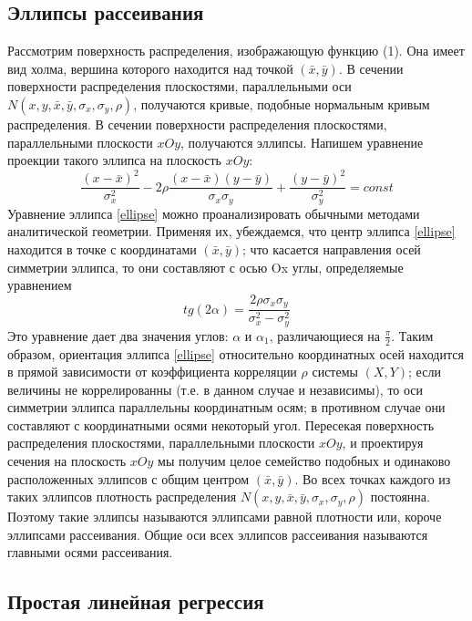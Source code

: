\documentclass[a4paper]{article}
\begin{document}
\subsection{Эллипсы рассеивания}
\noindent Рассмотрим поверхность распределения, изображающую функцию (1). Она имеет вид холма, вершина которого находится над точкой $(\bar{x},\bar{y})$.
\newline
В сечении поверхности распределения плоскостями, параллельными оси $ N(x, y, \bar{x}, \bar{y}, \sigma_{x}, \sigma_{y}, \rho)$, получаются кривые, подобные нормальным кривым распределения. В сечении поверхности распределения плоскостями, параллельными плоскости $xOy$, получаются эллипсы. Напишем уравнение проекции такого эллипса на плоскость $xOy$: 
$$
\frac{(x-\bar{x})^{2}}{\sigma_{x}^{2}} - 
2\rho\frac{(x-\bar{x})(y-\bar{y})}{\sigma_{x}\sigma_{y}}+
\frac{(y-\bar{y})^{2}}{\sigma_{y}^{2}} = const
\label{ellipse}
$$
Уравнение эллипса \ref{ellipse} можно проанализировать обычными методами аналитической геометрии. Применяя их, убеждаемся, что центр эллипса \ref{ellipse} находится в точке с координатами $(\bar{x},\bar{y})$; что касается направления осей симметрии эллипса, то они составляют с осью Ox углы, определяемые уравнением
$$
tg(2\alpha) = \frac{2\rho\sigma_{x}\sigma_{y}}{\sigma_{x}^{2} - \sigma_{y}^{2}}
\label{angle}
$$
Это уравнение дает два значения углов: $\alpha$ и $\alpha_{1}$, различающиеся на $\frac{\pi}{2}$.
\newline
Таким образом, ориентация эллипса \ref{ellipse} относительно координатных осей находится в прямой зависимости от коэффициента корреляции $\rho$ системы $(X,Y)$; если величины не коррелированны (т.е. в данном случае и независимы), то оси симметрии эллипса параллельны координатным осям; в противном случае они составляют с координатными осями некоторый угол.
\newline
Пересекая поверхность распределения плоскостями, параллельными плоскости $xOy$, и проектируя сечения на плоскость $xOy$ мы получим целое семейство подобных и одинаково расположенных эллипсов с общим центром $(\bar{x},\bar{y})$. Во всех точках каждого из таких эллипсов плотность распределения $ N(x, y, \bar{x}, \bar{y}, \sigma_{x}, \sigma_{y}, \rho)$ постоянна. Поэтому такие эллипсы называются эллипсами равной плотности или, короче эллипсами рассеивания. Общие оси всех эллипсов рассеивания называются главными осями рассеивания.

\subsection{Простая линейная регрессия}
\end{document}
